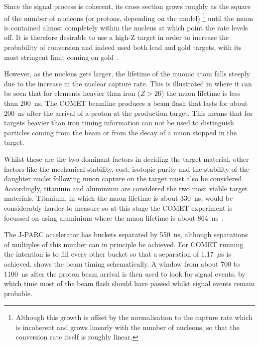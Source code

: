 Since the signal process is coherent, its cross section grows roughly as the square of the number of nucleons (or protons, depending on the model)%
\footnote{Although this growth is offset by the normalisation to the capture rate which is incoherent and grows linearly with the number of nucleons, so that the conversion rate itself is roughly linear.}
until the muon is contained almost completely within the nucleus at which point the rate levels off.
It is therefore desirable to use a high-Z target in order to increase the probability of conversion and indeed \sindrumII used both lead and gold targets, with its most stringent limit coming on gold~\cite{sindrum2006}.

However, as the nucleus gets larger, the lifetime of the muonic atom falls steeply due to the increase in the nuclear capture rate.
This is illustrated in  where it can be seen that for elements heavier than iron ($Z>26$) the muon lifetime is less than 200~ns.
The COMET beamline produces a beam flash that lasts for about 200~ns after the arrival of a proton at the production target.
This means that for targets heavier than iron timing information can not be used to distinguish particles coming from the beam or from the decay of a muon stopped in the target.

Whilst these are the two dominant factors in deciding the target material, other factors like the mechanical stability, cost, isotopic purity and the stability of the daughter nuclei following muon capture on the target must also be considered.
Accordingly, titanium and aluminium are considered the two most viable target materials.  
Titanium, in which the muon lifetime is about 330~ns, would be considerably harder to measure \mueconv so at this stage the COMET experiment is focussed on using aluminium where the muon lifetime is about 864~ns~\cite{Suzuki1987}.

The J-PARC accelerator has buckets separated by 550~ns, although separations of multiples of this number can in principle be achieved.
For COMET running the intention is to fill every other bucket so that a separation of 1.17~$\mu$s is achieved.
 shows the beam timing schematically.  
A window from about 700 to 1100~ns after the proton beam arrival is then used to look for signal events, by which time most of the beam flash should have passed whilst signal events remain probable.

